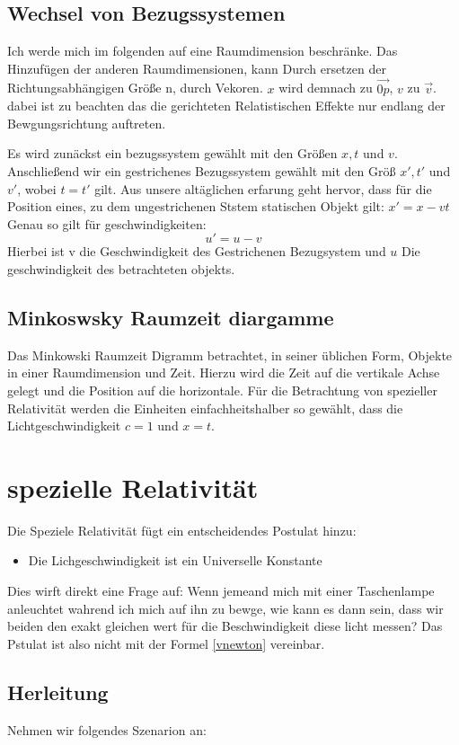\documentclass[12pt]{article}
\begin{document}
\subsection{Wechsel von Bezugssystemen}
Ich werde mich im folgenden auf eine Raumdimension beschränke.
Das Hinzufügen der anderen Raumdimensionen, kann Durch ersetzen der Richtungsabhängigen Größe
n, durch Vekoren.
$x$ wird demnach zu $\vec{0p}$, $v$ zu $\vec{v}$.
dabei ist zu beachten das die gerichteten Relatistischen Effekte nur endlang der Bewgungsrichtung auftreten.

Es wird zunäckst ein bezugssystem gewählt mit den Größen $x, t$ und $v$.
Anschließend wir ein gestrichenes Bezugssystem gewählt mit den Größ $x', t'$ und $v'$, wobei $t = t'$ gilt.
Aus unsere altäglichen erfarung geht hervor, dass für die Position eines, zu dem ungestrichenen Ststem statischen Objekt gilt: $x' = x-vt$
Genau so gilt für geschwindigkeiten:
\begin{equation}
\label{vnewton}
u' =u - v
\end{equation}
Hierbei ist v die Geschwindigkeit des Gestrichenen Bezugsystem und $u$ Die geschwindigkeit des betrachteten objekts.
\subsection{Minkoswsky Raumzeit diargamme}
Das Minkowski Raumzeit Digramm betrachtet, in seiner üblichen Form, Objekte in einer Raumdimension und Zeit.
Hierzu wird die Zeit auf die vertikale Achse gelegt und die Position auf die horizontale.
Für die Betrachtung von spezieller Relativität werden die Einheiten einfachheitshalber so gewählt, dass die Lichtgeschwindigkeit $c = 1$ und $x = t$.
\section{spezielle Relativität}
Die Speziele Relativität fügt ein entscheidendes Postulat hinzu:
\begin{itemize}
\item Die Lichgeschwindigkeit ist ein Universelle Konstante
\end{itemize}
Dies wirft direkt eine Frage auf:
Wenn jemeand mich mit einer Taschenlampe anleuchtet wahrend ich mich auf ihn zu bewge, wie kann es dann sein, dass wir beiden den exakt gleichen wert für die Beschwindigkeit diese licht messen?
Das Pstulat ist also nicht mit der Formel \ref{vnewton} vereinbar.
\subsection{Herleitung}
Nehmen wir folgendes Szenarion an:
\end{document}
